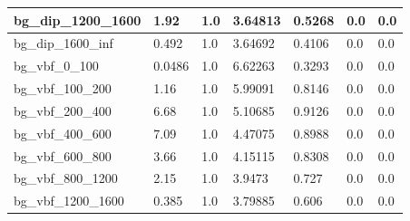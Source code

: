\documentclass[a4paper, 10pt]{article}
\begin{document}
\begin{table}[H]
\begin{center}
\begin{tabular}{|m{23.0mm}|m{23.0mm}|m{18.0mm}|m{19.0mm}|m{19.0mm}|m{19.0mm}|m{19.0mm}|}
      \hline
      {\cellcolor{white}         bg\_dip\_1200\_1600}& {\cellcolor{white}         1.92}& {\cellcolor{white}         1.0}& {\cellcolor{white}         3.64813}& {\cellcolor{white}         0.5268}& {\cellcolor{green}         0.0}& {\cellcolor{green}         0.0}\\
      \hline
      {\cellcolor{white}         bg\_dip\_1600\_inf}& {\cellcolor{white}         0.492}& {\cellcolor{white}         1.0}& {\cellcolor{white}         3.64692}& {\cellcolor{white}         0.4106}& {\cellcolor{green}         0.0}& {\cellcolor{green}         0.0}\\
      \hline
      {\cellcolor{white}         bg\_vbf\_0\_100}& {\cellcolor{white}         0.0486}& {\cellcolor{white}         1.0}& {\cellcolor{white}         6.62263}& {\cellcolor{white}         0.3293}& {\cellcolor{green}         0.0}& {\cellcolor{green}         0.0}\\
      \hline
      {\cellcolor{white}         bg\_vbf\_100\_200}& {\cellcolor{white}         1.16}& {\cellcolor{white}         1.0}& {\cellcolor{white}         5.99091}& {\cellcolor{white}         0.8146}& {\cellcolor{green}         0.0}& {\cellcolor{green}         0.0}\\
      \hline
      {\cellcolor{white}         bg\_vbf\_200\_400}& {\cellcolor{white}         6.68}& {\cellcolor{white}         1.0}& {\cellcolor{white}         5.10685}& {\cellcolor{white}         0.9126}& {\cellcolor{green}         0.0}& {\cellcolor{green}         0.0}\\
      \hline
      {\cellcolor{white}         bg\_vbf\_400\_600}& {\cellcolor{white}         7.09}& {\cellcolor{white}         1.0}& {\cellcolor{white}         4.47075}& {\cellcolor{white}         0.8988}& {\cellcolor{green}         0.0}& {\cellcolor{green}         0.0}\\
      \hline
      {\cellcolor{white}         bg\_vbf\_600\_800}& {\cellcolor{white}         3.66}& {\cellcolor{white}         1.0}& {\cellcolor{white}         4.15115}& {\cellcolor{white}         0.8308}& {\cellcolor{green}         0.0}& {\cellcolor{green}         0.0}\\
      \hline
      {\cellcolor{white}         bg\_vbf\_800\_1200}& {\cellcolor{white}         2.15}& {\cellcolor{white}         1.0}& {\cellcolor{white}         3.9473}& {\cellcolor{white}         0.727}& {\cellcolor{green}         0.0}& {\cellcolor{green}         0.0}\\
      \hline
      {\cellcolor{white}         bg\_vbf\_1200\_1600}& {\cellcolor{white}         0.385}& {\cellcolor{white}         1.0}& {\cellcolor{white}         3.79885}& {\cellcolor{white}         0.606}& {\cellcolor{green}         0.0}& {\cellcolor{green}         0.0}\\

\end{tabular}
\end{center}
\end{table}
\end{document}
